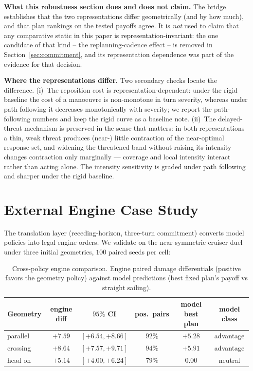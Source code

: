 \documentclass[12pt,a4paper]{article}
\begin{document}
\noindent\textbf{What this robustness section does and does not claim.}  The
bridge establishes that the two representations differ geometrically (and by
how much), and that plan rankings on the tested payoffs agree.  It is
\emph{not} used to claim that any comparative static in this paper is
representation-invariant: the one candidate of that kind -- the
replanning-cadence effect -- is removed in Section~\ref{sec:commitment}, and
its representation dependence was part of the evidence for that decision.

\noindent\textbf{Where the representations differ.}  Two secondary checks
locate the difference.  (i)~The reposition cost is representation-dependent:
under the rigid baseline the cost of a manoeuvre is non-monotone in turn
severity, whereas under path following it decreases monotonically with
severity; we report the path-following numbers and keep the rigid curve as a
baseline note.  (ii)~The delayed-threat mechanism is preserved in the sense
that matters: in both representations a thin, weak threat produces (near-)
little contraction of the near-optimal response set, and widening the
threatened band without raising its intensity changes contraction only
marginally --- coverage and local intensity interact rather than acting
alone.  The intensity sensitivity is graded under path following
and sharper under the rigid baseline.

\section{External Engine Case Study}\label{sec:validation}

The translation layer (receding-horizon, three-turn commitment) converts
model policies into legal engine orders.  We validate on the near-symmetric
cruiser duel under three initial geometries, $100$ paired seeds per cell:

\begin{table}[!htb]
\centering\small
\caption{Cross-policy engine comparison.  Engine paired damage differentials
(positive favors the geometry policy) against model predictions (best
fixed plan's payoff vs straight sailing).}
\label{tab:b13}
\begin{tabular}{lccccc}
\toprule
Geometry & engine diff & $95\%$ CI & pos.\ pairs & model best plan & model class \\
\midrule
parallel & $+7.59$ & $[+6.54,+8.66]$ & $92\%$ & $+5.28$ & advantage \\
crossing & $+8.64$ & $[+7.57,+9.71]$ & $94\%$ & $+5.91$ & advantage \\
head-on & $+5.14$ & $[+4.00,+6.24]$ & $79\%$ & $0.00$ & neutral \\
\bottomrule
\end{tabular}
\end{table}
\end{document}
